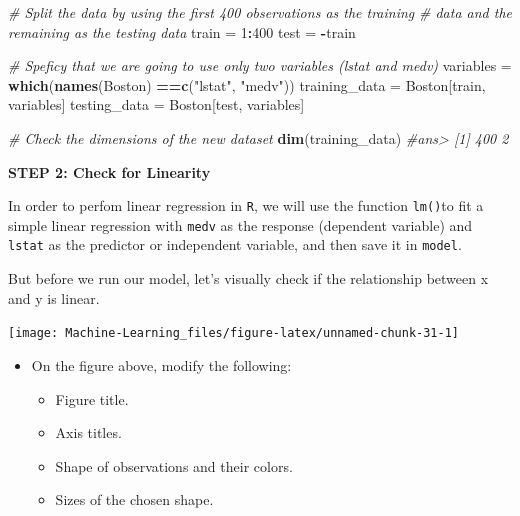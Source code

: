 \documentclass[]{book}
\newenvironment{Shaded}{\begin{snugshade}}{\end{snugshade}}
\newcommand{\KeywordTok}[1]{\textcolor[rgb]{0.13,0.29,0.53}{\textbf{#1}}}
\newcommand{\DecValTok}[1]{\textcolor[rgb]{0.00,0.00,0.81}{#1}}
\newcommand{\StringTok}[1]{\textcolor[rgb]{0.31,0.60,0.02}{#1}}
\newcommand{\CommentTok}[1]{\textcolor[rgb]{0.56,0.35,0.01}{\textit{#1}}}
\newcommand{\OperatorTok}[1]{\textcolor[rgb]{0.81,0.36,0.00}{\textbf{#1}}}
\newcommand{\NormalTok}[1]{#1}
\providecommand{\tightlist}{%
  \setlength{\itemsep}{0pt}\setlength{\parskip}{0pt}}
\newenvironment{rmdblock}[1]
  {\begin{shaded*}
  \begin{itemize}
  \renewcommand{\labelitemi}{
    \raisebox{-.7\height}[0pt][0pt]{
      {\setkeys{Gin}{width=2em,keepaspectratio}\texttt{[image: img/icons/\#1]}}
    }
  }
  \item
  }
  {
  \end{itemize}
  \end{shaded*}
  }
\newenvironment{rmdexercise}
  {\begin{rmdblock}{exercise}}
  {\end{rmdblock}}
\theoremstyle{definition}
\theoremstyle{definition}
\theoremstyle{definition}
\theoremstyle{remark}
\begin{document}
\begin{Shaded}
\begin{Highlighting}[]
\CommentTok{# Split the data by using the first 400 observations as the training}
\CommentTok{# data and the remaining as the testing data}
\NormalTok{train =}\StringTok{ }\DecValTok{1}\OperatorTok{:}\DecValTok{400}
\NormalTok{test =}\StringTok{ }\OperatorTok{-}\NormalTok{train}

\CommentTok{# Speficy that we are going to use only two variables (lstat and medv)}
\NormalTok{variables =}\StringTok{ }\KeywordTok{which}\NormalTok{(}\KeywordTok{names}\NormalTok{(Boston) }\OperatorTok{==}\KeywordTok{c}\NormalTok{(}\StringTok{"lstat"}\NormalTok{, }\StringTok{"medv"}\NormalTok{))}
\NormalTok{training_data =}\StringTok{ }\NormalTok{Boston[train, variables]}
\NormalTok{testing_data =}\StringTok{ }\NormalTok{Boston[test, variables]}

\CommentTok{# Check the dimensions of the new dataset}
\KeywordTok{dim}\NormalTok{(training_data)}
\CommentTok{#ans> [1] 400   2}
\end{Highlighting}
\end{Shaded}

\textbf{STEP 2: Check for Linearity}

In order to perfom linear regression in \texttt{R}, we will use the
function \texttt{lm()}to fit a simple linear regression with
\texttt{medv} as the response (dependent variable) and \texttt{lstat} as
the predictor or independent variable, and then save it in
\texttt{model}.

But before we run our model, let's visually check if the relationship
between x and y is linear.

\begin{Shaded}
\end{Shaded}

\begin{center}\texttt{[image: Machine-Learning\_files/figure-latex/unnamed-chunk-31-1]} \end{center}

\begin{rmdexercise}
On the figure above, modify the following:

\begin{itemize}
\tightlist
\item
  Figure title.
\item
  Axis titles.
\item
  Shape of observations and their colors.
\item
  Sizes of the chosen shape.
\end{itemize}
\end{rmdexercise}
\end{document}
